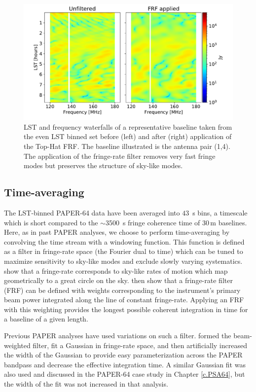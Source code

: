 \begin{figure}[tp]
\centering
\includegraphics[width=.85\textwidth]{plots/data_bl_waterfalls.pdf}
\caption{LST and frequency waterfalls of a representative
baseline taken from the even LST binned set before (left)
and after (right) application of the Top-Hat FRF.
The baseline illustrated is the antenna pair (1,4). The application of the fringe-rate filter removes very fast
fringe modes but preserves the structure of sky-like
modes.}
\label{fig:waterfalls}
\end{figure}

\subsection{Time-averaging}

The LST-binned PAPER-64 data have been averaged into $43$~s bins, a timescale
which is short compared to the $\sim$3500~s fringe coherence time of 30\,m baselines.
Here, as in past PAPER analyses, we choose to perform time-averaging by convolving the time stream with a windowing function.
This function is defined as a filter in fringe-rate space
(the Fourier dual to time) which can be tuned to maximize sensitivity to sky-like modes and exclude slowly varying systematics.
\cite{parsons_backer2009} show that
a fringe-rate corresponds to sky-like rates of motion which map geometrically to
a great circle on the sky.
\cite{parsons_et_al2016} then show that a fringe-rate filter (FRF) can be defined with weights corresponding
to the instrument's primary beam power integrated along the line of constant fringe-rate. Applying an FRF with this weighting provides the longest possible coherent integration in time for a baseline of a given length.

Previous PAPER analyses have used variations on such a filter.  
formed the beam-weighted filter, fit a Gaussian
in fringe-rate space, and then artificially increased
the width of the Gaussian
to provide easy parameterization across the PAPER
bandpass and decrease the effective integration time.
A similar Gaussian fit was
also used and discussed in the PAPER-64 case study in Chapter \ref{c.PSA64},
but the width of the fit was not increased in that
analysis.

